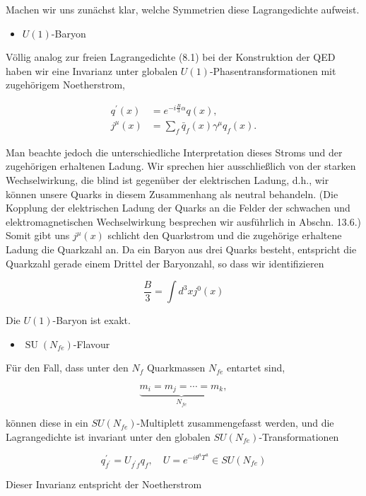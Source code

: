 \documentclass[10pt, letterpaper]{article}
\begin{document}
Machen wir uns zunächst klar, welche Symmetrien diese Lagrangedichte aufweist.

\begin{itemize}
  \item $U(1)$-Baryon
\end{itemize}

Völlig analog zur freien Lagrangedichte (8.1) bei der Konstruktion der QED haben wir eine Invarianz unter globalen $U(1)$-Phasentransformationen mit zugehörigem Noetherstrom,

$$
\begin{aligned}
q^{\prime}(x) & =e^{-i \frac{B}{3} \alpha} q(x), \\
j^{\mu}(x) & =\sum_{f} \bar{q}_{f}(x) \gamma^{\mu} q_{f}(x) .
\end{aligned}
$$

Man beachte jedoch die unterschiedliche Interpretation dieses Stroms und der zugehörigen erhaltenen Ladung. Wir sprechen hier ausschließlich von der starken Wechselwirkung, die blind ist gegenüber der elektrischen Ladung, d.h., wir können unsere Quarks in diesem Zusammenhang als neutral behandeln. (Die Kopplung der elektrischen Ladung der Quarks an die Felder der schwachen und elektromagnetischen Wechselwirkung besprechen wir ausführlich in Abschn. 13.6.) Somit gibt uns $j^{\mu}(x)$ schlicht den Quarkstrom und die zugehörige erhaltene Ladung die Quarkzahl an. Da ein Baryon aus drei Quarks besteht, entspricht die Quarkzahl gerade einem Drittel der Baryonzahl, so dass wir identifizieren

$$
\frac{B}{3}=\int d^{3} x j^{0}(x)
$$

Die $U(1)$-Baryon ist exakt.

\begin{itemize}
  \item $\operatorname{SU}\left(N_{f e}\right)$-Flavour
\end{itemize}

Für den Fall, dass unter den $N_{f}$ Quarkmassen $N_{f e}$ entartet sind,

$$
\underbrace{m_{i}=m_{j}=\cdots=m_{k}}_{N_{f e}},
$$

können diese in ein $S U\left(N_{f e}\right)$-Multiplett zusammengefasst werden, und die Lagrangedichte ist invariant unter den globalen $S U\left(N_{f e}\right)$-Transformationen

$$
q_{f^{\prime}}^{\prime}=U_{f^{\prime} f} q_{f}, \quad U=e^{-i \theta^{a} T^{a}} \in S U\left(N_{f e}\right)
$$

Dieser Invarianz entspricht der Noetherstrom
\end{document}
